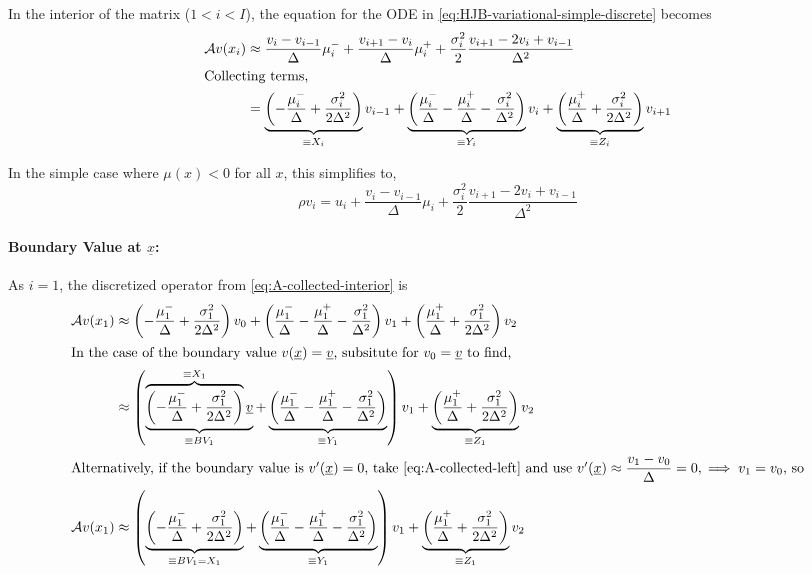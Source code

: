 \documentclass[11pt]{etk-article}
\begin{document}
In the interior of the matrix ($1 < i < I$), the equation for the ODE in \cref{eq:HJB-variational-simple-discrete} becomes
\begin{align}
\mathcal{A} v(x_i) &\approx \dfrac{v_i-v_{i-1}}{\Delta}\mu_i^{-}+ \dfrac{v_{i+1}-v_i}{\Delta}\mu_i^{+}  + \dfrac{\sigma_i^2}{2} \dfrac{v_{i+1} - 2 v_i + v_{i-1}}{\Delta^2}\\
\intertext{Collecting terms,}
&= \underbrace{\left(-\frac{\mu_i^{-}}{\Delta} +\frac{\sigma_i^2}{2\Delta^2}\right)}_{\equiv X_i}v_{i-1} + \underbrace{\left(\frac{\mu_i^{-}}{\Delta} - \frac{\mu_i^{+}}{\Delta}-\frac{\sigma_i^2}{\Delta^2}\right)}_{\equiv Y_i}v_i + \underbrace{\left(\frac{\mu_i^{+}}{\Delta} + \frac{\sigma_i^2}{2\Delta^2}\right)}_{\equiv Z_i}v_{i+1}\label{eq:A-collected-interior}
\end{align}

\noindent In the simple case where $\mu(x) < 0$ for all $x$, this simplifies to,
\begin{equation}
\rho v_i = u_i +  \dfrac{v_i-v_{i-1}}{\Delta}\mu_i + \dfrac{\sigma_i^2}{2} \dfrac{v_{i+1} - 2v_i + v_{i-1}}{\Delta^2}
\end{equation}
\paragraph{Boundary Value at $\underline{x}$:}
As $i =1$, the discretized operator from \cref{eq:A-collected-interior} is
\begin{align}
\mathcal{A} v(x_1) &\approx \left(-\frac{\mu_1^{-}}{\Delta} +\frac{\sigma_1^2}{2\Delta^2}\right)v_0 + \left(\frac{\mu_1^{-}}{\Delta} - \frac{\mu_1^{+}}{\Delta}-\frac{\sigma_1^2}{\Delta^2}\right)v_1 + \left(\frac{\mu_1^{+}}{\Delta} + \frac{\sigma_1^2}{2\Delta^2}\right)v_2\label{eq:A-collected-left}\\
\intertext{In the case of the boundary value $v(\underline{x}) = \underline{v}$, subsitute for $v_0 =  \underline{v}$ to find,}
&\approx \left(\underbrace{\overbrace{\left(-\frac{\mu_1^{-}}{\Delta} +\frac{\sigma_1^2}{2\Delta^2}\right)}^{\equiv X_1}\underline{v}}_{\equiv BV_1} + \underbrace{\left(\frac{\mu_1^{-}}{\Delta} - \frac{\mu_1^{+}}{\Delta}-\frac{\sigma_1^2}{\Delta^2}\right)}_{\equiv Y_1}\right)v_1 + \underbrace{\left(\frac{\mu_1^{+}}{\Delta} + \frac{\sigma_1^2}{2\Delta^2}\right)}_{\equiv Z_1}v_2\\
\intertext{Alternatively, if the boundary value is $v'(\underline{x}) = 0$, take \cref{eq:A-collected-left} and use $v'(\underline{x}) \approx \dfrac{v_1-v_0}{\Delta} = 0, \implies v_1 = v_0$, so}
\mathcal{A} v(x_1) &\approx \left(\underbrace{\left(-\frac{\mu_1^{-}}{\Delta} +\frac{\sigma_1^2}{2\Delta^2}\right)}_{\equiv BV_1 = X_1} + \underbrace{\left(\frac{\mu_1^{-}}{\Delta} - \frac{\mu_1^{+}}{\Delta}-\frac{\sigma_1^2}{\Delta^2}\right)}_{\equiv Y_1}\right)v_1 + \underbrace{\left(\frac{\mu_1^{+}}{\Delta} + \frac{\sigma_1^2}{2\Delta^2}\right)}_{\equiv Z_1}v_2\\
\end{align}
\end{document}
